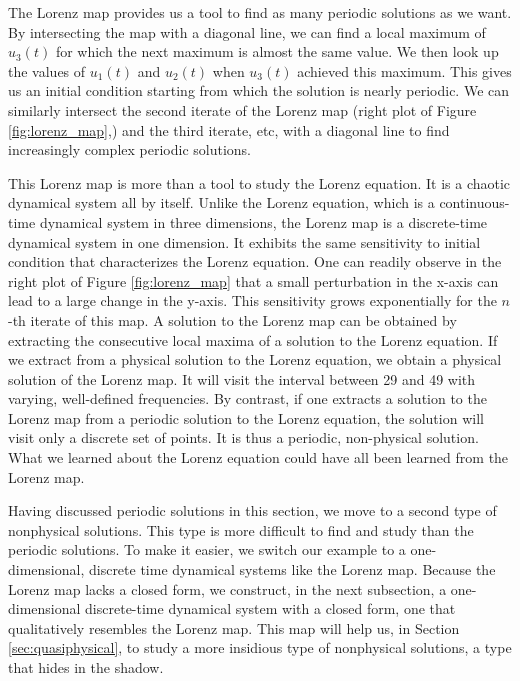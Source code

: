 The Lorenz map provides us a tool to find as many periodic solutions as we want.
By intersecting the map with a diagonal line, we can find a local maximum of $u_3(t)$
for which the next maximum is almost the same value.  We then look up the values of
$u_1(t)$ and $u_2(t)$ when $u_3(t)$ achieved this maximum.  This gives us an initial
condition starting from which the solution is nearly periodic.   We can similarly
intersect the second iterate of the Lorenz map (right plot of Figure \ref{fig:lorenz_map},)
and the third iterate, etc, with a diagonal line to find increasingly
complex periodic solutions. 

This Lorenz map is more than a tool to study the Lorenz equation.  It is a chaotic
dynamical system all by itself. Unlike the Lorenz equation, which is a continuous-time
dynamical system in three dimensions, the Lorenz map is a discrete-time dynamical
system in one dimension.  It exhibits the same sensitivity to initial condition
that characterizes the Lorenz equation.  One can readily observe in the right
plot of Figure \ref{fig:lorenz_map} that a small perturbation in the x-axis
can lead to a large change in the y-axis. This sensitivity grows exponentially
for the $n$-th iterate of this map. A solution to the Lorenz map can be obtained
by extracting the consecutive local maxima of a solution to the Lorenz equation.
If we extract from a physical solution to the Lorenz equation, we obtain a physical solution of the Lorenz map.  It will visit the
interval between 29 and 49 with varying, well-defined frequencies.
By contrast, if one extracts a solution to the Lorenz map from a periodic solution
to the Lorenz equation, the solution will visit only a discrete set of points.
It is thus a periodic, non-physical solution.  What we learned about
the Lorenz equation could have all been learned from the Lorenz map.

Having discussed periodic solutions in this section,
we move to a second type of nonphysical solutions.
This type is more difficult to find and study than the periodic solutions.
To make it easier, we switch our example to a one-dimensional, discrete time dynamical
systems like the Lorenz map.  Because the Lorenz map lacks a closed form,
we construct, in the next subsection, a one-dimensional discrete-time dynamical system
with a closed form, one that qualitatively resembles the Lorenz map.  This map
will help us, in Section \ref{sec:quasiphysical}, to study a more insidious type
of nonphysical solutions, a type that hides in the shadow.
